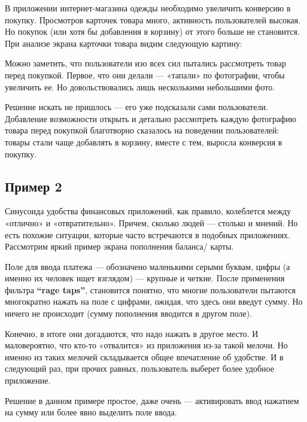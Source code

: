 \documentclass{article}
\begin{document}
В приложении интернет-магазина одежды необходимо увеличить конверсию в покупку. Просмотров карточек товара много, активность пользователей высокая. Но покупок (или хотя бы добавления в корзину) от этого больше не становится. При анализе экрана карточки товара видим следующую картину:


Можно заметить, что пользователи изо всех сил пытались рассмотреть товар перед покупкой. Первое, что они делали — «тапали» по фотографии, чтобы увеличить ее. Но довольствовались лишь несколькими небольшими фото.

Решение искать не пришлось — его уже подсказали сами пользователи. Добавление возможности открыть и детально рассмотреть каждую фотографию товара перед покупкой благотворно сказалось на поведении пользователей: товары стали чаще добавлять в корзину, вместе с тем, выросла конверсия в покупку.

\subsection{Пример 2}

Синусоида удобства финансовых приложений, как правило, колеблется между «отлично» и «отвратительно». Причем, сколько людей — столько и мнений. Но есть похожие ситуации, которые часто встречаются в подобных приложениях. Рассмотрим яркий пример экрана пополнения баланса/ карты.


Поле для ввода платежа — обозначено маленькими серыми буквам, цифры (а именно их человек ищет взглядом) — крупные и четкие. После применения фильтра \textbf{“rage taps”}, становится понятно, что многие пользователи пытаются многократно нажать на поле с цифрами, ожидая, что здесь они введут сумму. Но ничего не происходит (сумму пополнения вводится в другом поле).

Конечно, в итоге они догадаются, что надо нажать в другое место. И маловероятно, что кто-то «отвалится» из приложения из-за такой мелочи. Но именно из таких мелочей складывается общее впечатление об удобстве. И в следующий раз, при прочих равных, пользователь выберет более удобное приложение.

Решение в данном примере простое, даже очень — активировать ввод нажатием на сумму или более явно выделить поле ввода.
\end{document}
